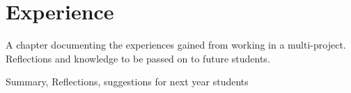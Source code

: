 \chapter{Experience}

A chapter documenting the experiences gained from working in a multi-project. Reflections and knowledge to be passed on to future students.

Summary, Reflections, suggestions for next year students